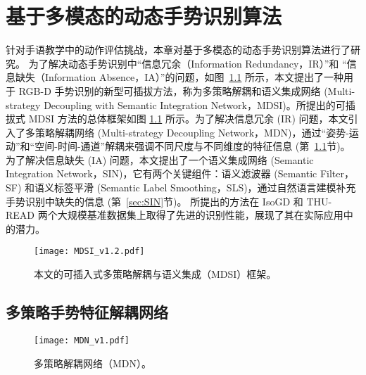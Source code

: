 
\chapter{基于多模态的动态手势识别算法}
\label{sec:GR}
针对手语教学中的动作评估挑战，本章对基于多模态的动态手势识别算法进行了研究。
为了解决动态手势识别中“信息冗余（Information Redundancy，IR）”和 “信息缺失（Information Absence，IA）”的问题，如图~\ref{fig:MDSI} 所示，本文提出了一种用于 RGB-D 手势识别的新型可插拔方法，称为多策略解耦和语义集成网络 (Multi-strategy Decoupling with Semantic Integration Network，MDSI)。所提出的可插拔式 MDSI 方法的总体框架如图 \ref{fig:MDSI} 所示。为了解决信息冗余 (IR) 问题，本文引入了多策略解耦网络 (Multi-strategy Decoupling Network，MDN)，通过“姿势-运动”和“空间-时间-通道”解耦来强调不同尺度与不同维度的特征信息 (第~\ref{sec:MDN}节)。
为了解决信息缺失 (IA) 问题，本文提出了一个语义集成网络 (Semantic Integration Network，SIN)，它有两个关键组件：语义滤波器 (Semantic Filter，SF) 和语义标签平滑 (Semantic Label Smoothing，SLS)，通过自然语言建模补充手势识别中缺失的信息 (第~\ref{sec:SIN}节)。
所提出的方法在 IsoGD 和 THU-READ 两个大规模基准数据集上取得了先进的识别性能，展现了其在实际应用中的潜力。
\begin{figure}[tb]
  \centering
  \texttt{[image: MDSI\_v1.2.pdf]}%
  \caption{本文的可插入式多策略解耦与语义集成（MDSI）框架。}
  \label{fig:MDSI}
\end{figure}

\section{多策略手势特征解耦网络}
\label{sec:MDN}
\begin{figure}[tb]
  \centering
  \texttt{[image: MDN\_v1.pdf]}
    \caption{多策略解耦网络（MDN）。}
  \label{fig:MDN}
\end{figure}

